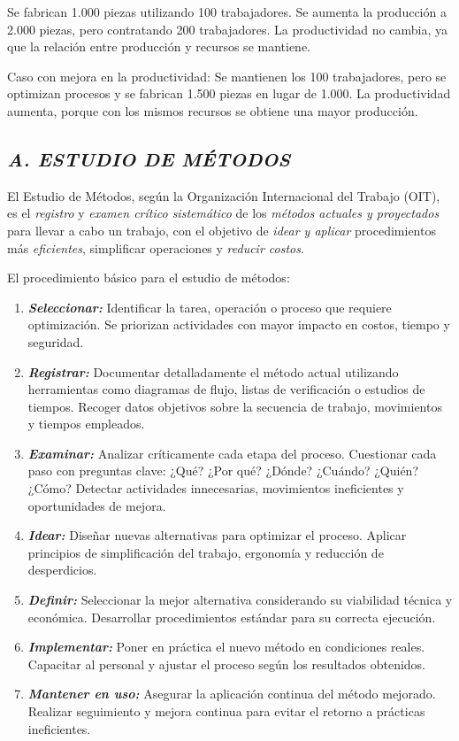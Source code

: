 \documentclass[a4paper,oneside,11pt]{article}
\begin{document}
Se fabrican 1.000 piezas utilizando 100 trabajadores.
Se aumenta la producción a 2.000 piezas, pero contratando 200 trabajadores.
La productividad no cambia, ya que la relación entre producción y recursos se mantiene.

Caso con mejora en la productividad:
Se mantienen los 100 trabajadores, pero se optimizan procesos y se fabrican 1.500 piezas en lugar de 1.000.
La productividad aumenta, porque con los mismos recursos se obtiene una mayor producción.


\subsection{\textit{A. ESTUDIO DE MÉTODOS}}

El Estudio de Métodos, según la Organización Internacional del Trabajo (OIT), es el \textit{registro} y \textit{examen crítico sistemático} de los \textit{métodos actuales y proyectados} para llevar a cabo un trabajo, con el objetivo de \textit{idear y aplicar} procedimientos más \textit{eficientes}, simplificar operaciones y \textit{reducir costos}.

El procedimiento básico para el estudio de métodos:

\begin{enumerate}
    \item \textit{\textbf{Seleccionar:}} Identificar la tarea, operación o proceso que requiere optimización. Se priorizan actividades con mayor impacto en costos, tiempo y seguridad.

    \item \textit{\textbf{Registrar:}} Documentar detalladamente el método actual utilizando herramientas como diagramas de flujo, listas de verificación o estudios de tiempos. Recoger datos objetivos sobre la secuencia de trabajo, movimientos y tiempos empleados.

    \item \textit{\textbf{Examinar:}} Analizar críticamente cada etapa del proceso. Cuestionar cada paso con preguntas clave: ¿Qué? ¿Por qué? ¿Dónde? ¿Cuándo? ¿Quién? ¿Cómo? Detectar actividades innecesarias, movimientos ineficientes y oportunidades de mejora. 

    \item \textit{\textbf{Idear:}} Diseñar nuevas alternativas para optimizar el proceso. Aplicar principios de simplificación del trabajo, ergonomía y reducción de desperdicios.

    \item \textit{\textbf{Definir:}} Seleccionar la mejor alternativa considerando su viabilidad técnica y económica. Desarrollar procedimientos estándar para su correcta ejecución.

    \item \textit{\textbf{Implementar:}} Poner en práctica el nuevo método en condiciones reales. Capacitar al personal y ajustar el proceso según los resultados obtenidos.

    \item \textit{\textbf{Mantener en uso:}} Asegurar la aplicación continua del método mejorado. Realizar seguimiento y mejora continua para evitar el retorno a prácticas ineficientes.
\end{enumerate}
\end{document}
